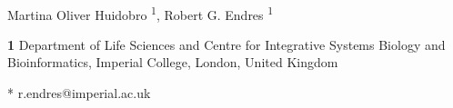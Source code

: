 \documentclass[10pt,letterpaper]{article}
\begin{document}
\vspace*{0.2in}

\begin{flushleft}
{\Large
\textbf{} %
}
\newline
\\
Martina Oliver Huidobro \textsuperscript{1},
Robert G. Endres \textsuperscript{1}


\bigskip
\textbf{1} Department of Life Sciences and Centre for Integrative Systems Biology and Bioinformatics, Imperial College, London, United Kingdom
\\
\bigskip

% 
%






* r.endres@imperial.ac.uk

\end{flushleft}
\end{document}
